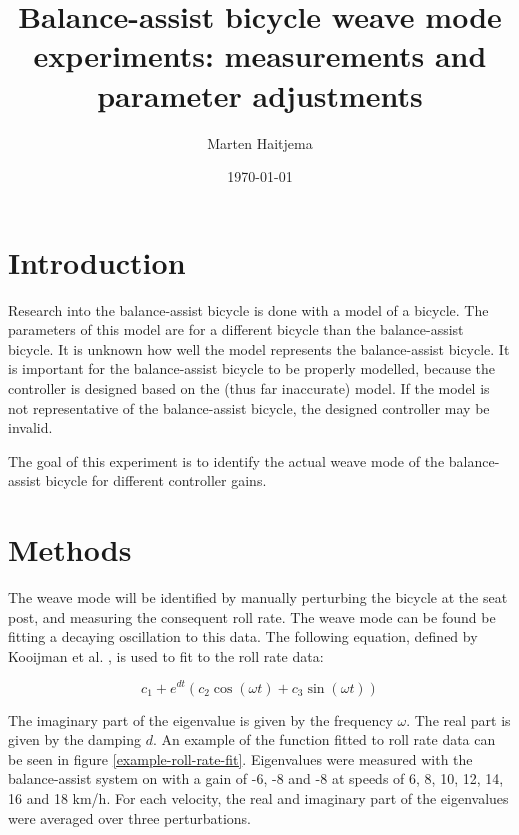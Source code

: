 \documentclass[12pt]{article}
\title{Balance-assist bicycle weave mode experiments: measurements and parameter adjustments}
\author{Marten Haitjema}
\date{\today}
\begin{document}
\maketitle

\section{Introduction}
Research into the balance-assist bicycle is done with a model of a bicycle. The parameters of this
model are for a different bicycle than the balance-assist bicycle. It is unknown how well the model
represents the balance-assist bicycle. It is important for the balance-assist bicycle to be
properly modelled, because the controller is designed based on the (thus far inaccurate) model. If
the model is not representative of the balance-assist bicycle, the designed controller may be
invalid.

The goal of this experiment is to identify the actual weave mode of the balance-assist bicycle for
different controller gains.

\section{Methods}
The weave mode will be identified by manually perturbing the bicycle at the seat post, and
measuring the consequent roll rate. The weave mode can be found be fitting a decaying oscillation
to this data. The following equation, defined by Kooijman et al. \cite{Kooijman2008}, is used to
fit to the roll rate data:

\begin{equation}
    c_1 + e^{dt} (c_2\cos(\omega t) + c_3\sin(\omega t))
    \label{kooijman-func}
\end{equation}

The imaginary part of the eigenvalue is given by the frequency $\omega$. The real part is given by
the damping $d$. An example of the function fitted to roll rate data can be seen in figure
\ref{example-roll-rate-fit}. Eigenvalues were measured with the balance-assist system on with a
gain of -6, -8 and -8 at speeds of 6, 8, 10, 12, 14, 16 and 18 km/h. For each velocity, the real
and imaginary part of the eigenvalues were averaged over three perturbations.
\end{document}
